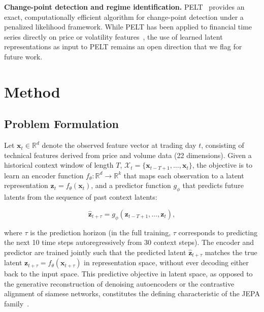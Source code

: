 \documentclass[11pt]{article}
\begin{document}
\textbf{Change-point detection and regime identification.}
PELT~\citep{killick2012pelt} provides an exact, computationally efficient algorithm for change-point detection under a penalized likelihood framework. While PELT has been applied to financial time series directly on price or volatility features~\citep{ross2013pelt,truong2020cpdetect}, the use of learned latent representations as input to PELT remains an open direction that we flag for future work.

\section{Method}

\subsection{Problem Formulation}

Let $\mathbf{x}_t \in \mathbb{R}^d$ denote the observed feature vector at trading day $t$, consisting of technical features derived from price and volume data (22 dimensions). Given a historical context window of length $T$, $\mathcal{X}_t = \{\mathbf{x}_{t-T+1}, \dots, \mathbf{x}_t\}$, the objective is to learn an encoder function $f_\theta: \mathbb{R}^d \to \mathbb{R}^k$ that maps each observation to a latent representation $\mathbf{z}_t = f_\theta(\mathbf{x}_t)$, and a predictor function $g_\phi$ that predicts future latents from the sequence of past context latents:

\begin{equation}
\hat{\mathbf{z}}_{t+\tau} = g_\phi(\mathbf{z}_{t-T+1}, \dots, \mathbf{z}_t),
\label{eq:prediction}
\end{equation}

where $\tau$ is the prediction horizon (in the full training, $\tau$ corresponds to predicting the next 10 time steps autoregressively from 30 context steps). The encoder and predictor are trained jointly such that the predicted latent $\hat{\mathbf{z}}_{t+\tau}$ matches the true latent $\mathbf{z}_{t+\tau} = f_\theta(\mathbf{x}_{t+\tau})$ in representation space, without ever decoding either back to the input space. This predictive objective in latent space, as opposed to the generative reconstruction of denoising autoencoders or the contrastive alignment of siamese networks, constitutes the defining characteristic of the JEPA family~\citep{lecun2022path}.
\end{document}
